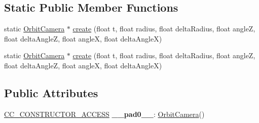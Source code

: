 \subsection*{Static Public Member Functions}
\begin{DoxyCompactItemize}
\item 
static \hyperlink{classOrbitCamera}{Orbit\+Camera} $\ast$ \hyperlink{classOrbitCamera_ae532b646f3753111665be1c5c9b79d13}{create} (float t, float radius, float delta\+Radius, float angleZ, float delta\+AngleZ, float angleX, float delta\+AngleX)
\item 
static \hyperlink{classOrbitCamera}{Orbit\+Camera} $\ast$ \hyperlink{classOrbitCamera_aaa711f8b0034f468ab0da71f69cc546d}{create} (float t, float radius, float delta\+Radius, float angleZ, float delta\+AngleZ, float angleX, float delta\+AngleX)
\end{DoxyCompactItemize}
\subsection*{Public Attributes}
\begin{DoxyCompactItemize}
\item 
\mbox{\label{classOrbitCamera_ab308cf6f06a7118d6e8c6d76bf4c14fa}} 
\hyperlink{_2cocos2d_2cocos_2base_2ccConfig_8h_a25ef1314f97c35a2ed3d029b0ead6da0}{C\+C\+\_\+\+C\+O\+N\+S\+T\+R\+U\+C\+T\+O\+R\+\_\+\+A\+C\+C\+E\+SS} {\bfseries \+\_\+\+\_\+pad0\+\_\+\+\_\+}\+: \hyperlink{classOrbitCamera}{Orbit\+Camera}()
\end{DoxyCompactItemize}
